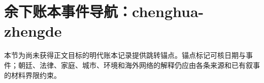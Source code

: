 \section{余下账本事件导航：chenghua-zhengde}

\label{sec:remaining-event-anchors-chenghua-zhengde}

本节为尚未获得正文目标的明代账本记录提供跳转锚点。锚点标记可核日期与事件；朝廷、法律、家庭、城市、环境和海外网络的解释仍应由各条来源和已有叙事的材料界限约束。
